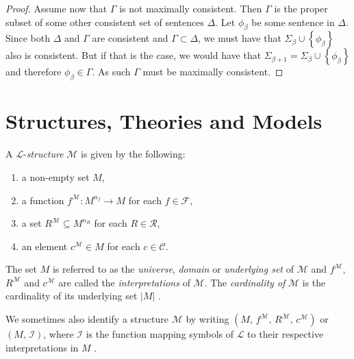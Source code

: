\documentclass[../../main.tex]{subfiles}
\begin{document}
\begin{proof}
    Assume now that $\Gamma$ is not maximally consistent.
    Then $\Gamma$ is the proper subset of some other consistent set of sentences $\Delta$.
    Let $\phi_{\beta}$ be some sentence in $\Delta$.
    Since both $\Delta$ and $\Gamma$ are consistent and $\Gamma \subset \Delta$, 
    we must have that $\Sigma_{\beta} \cup \left\{\phi_{\beta}\right\}$ also is consistent.
    But if that is the case, we would have that $\Sigma_{\beta + 1} = \Sigma_{\beta} \cup \left\{\phi_{\beta}\right\}$ and therefore $\phi_{\beta} \in \Gamma$.
    As such $\Gamma$ must be maximally consistent.
\end{proof}

\section{Structures, Theories and Models}
\begin{definition}\label{structure-def}
    A $\mathcal{L}$-\textit{structure} $\mathcal{M}$ is given by the following:
    \begin{enumerate}
        \item a non-empty set $M$,
        \item a function $f^{\mathcal{M}}: M^{n_f} \to M$ for each $f \in \mathcal{F}$,
        \item a set $R^\mathcal{M} \subseteq M^{n_R}$ for each $R \in \mathcal{R}$,
        \item an element $c^\mathcal{M} \in M$ for each $c \in \mathcal{C}$.
    \end{enumerate}
    The set $M$ is referred to as the \textit{universe}, \textit{domain} or \textit{underlying set} of $\mathcal{M}$ 
    and $f^{\mathcal{M}}$, $R^{\mathcal{M}}$ and $c^{\mathcal{M}}$ are called the \textit{interpretations} of $\mathcal{M}$. 
    The \textit{cardinality of} $\mathcal{M}$ is the cardinality of its underlying set $\left\lvert M\right\rvert$ \cite[Definition 1.1.2]{Mar02}.

    We sometimes also identify a structure $\mathcal{M}$ by writing $\left(M,\, f^{\mathcal{M}},\, R^{\mathcal{M}},\, c^{\mathcal{M}}\right)$ \cite{Mar02} or $\left(M,\, \mathcal{I}\right)$, 
    where $\mathcal{I}$ is the function mapping symbols of $\mathcal{L}$ to their respective interpretations in $M$ \cite[p.20]{Cha90}.
\end{definition}
\end{document}
